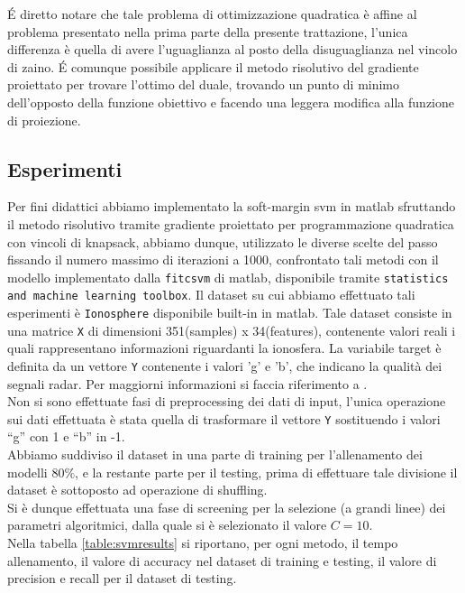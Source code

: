 \documentclass[12pt]{extarticle}
\newcommand{\quotes}[1]{``#1''}
\begin{document}
\'E diretto notare che tale problema di ottimizzazione quadratica è affine al problema presentato nella prima parte della presente trattazione, l'unica differenza è quella di avere l'uguaglianza al posto della disuguaglianza nel vincolo di zaino.
\'E comunque possibile applicare il metodo risolutivo del gradiente proiettato per trovare l'ottimo del duale, trovando un punto di minimo dell'opposto della funzione obiettivo e facendo una leggera modifica alla funzione di proiezione.
\subsection{Esperimenti}
Per fini didattici abbiamo implementato la soft-margin svm in matlab sfruttando il metodo risolutivo tramite gradiente proiettato per programmazione quadratica con vincoli di knapsack, abbiamo dunque, utilizzato le diverse scelte del passo fissando il numero massimo di iterazioni a 1000, confrontato tali metodi con il modello implementato dalla \texttt{fitcsvm} di matlab, disponibile tramite \texttt{statistics and machine learning toolbox}.
Il dataset su cui abbiamo effettuato tali esperimenti è \texttt{Ionosphere} disponibile built-in in matlab. Tale dataset consiste in una matrice \texttt{X} di dimensioni 351(samples) x 34(features), contenente valori reali i quali rappresentano informazioni riguardanti la ionosfera. La variabile target è definita da un vettore \texttt{Y} contenente i valori 'g' e 'b', che indicano la qualità dei segnali radar. Per maggiorni informazioni si faccia riferimento a \cite{ionosphere_dataset}.\\
Non si sono effettuate fasi di preprocessing dei dati di input, l'unica operazione sui dati effettuata è stata quella di trasformare il vettore \texttt{Y} sostituendo i valori \quotes{g} con 1 e \quotes{b} in -1.\\
Abbiamo suddiviso il dataset in una parte di training per l'allenamento dei modelli $80\%$, e la restante parte per il testing, prima di effettuare tale divisione il dataset è sottoposto ad operazione di shuffling.\\
Si è dunque effettuata una fase di screening per la selezione (a grandi linee) dei parametri algoritmici, dalla quale si è selezionato il valore $C=10$.\\
Nella tabella \ref{table:svmresults} si riportano, per ogni metodo, il tempo allenamento, il valore di accuracy nel dataset di training e testing, il valore di precision e recall per il dataset di testing.\\
\end{document}
